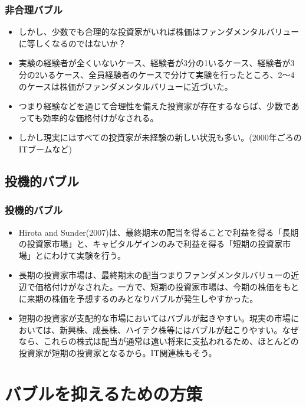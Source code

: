 \documentclass[dvipdfmx,12pt]{beamer}
\begin{document}
\begin{frame}
\frametitle{非合理バブル}
\begin{itemize}\setlength{\parskip}{0.5em}
\item
しかし、少数でも合理的な投資家がいれば株価はファンダメンタルバリューに等しくなるのではないか？
\item
実験の経験者が全くいないケース、経験者が3分の1いるケース、経験者が3分の2いるケース、全員経験者のケースで分けて実験を行ったところ、2〜4のケースは株価がファンダメンタルバリューに近づいた。
\item
つまり経験などを通じて合理性を備えた投資家が存在するならば、少数であっても効率的な価格付けがなされる。
\item
しかし現実にはすべての投資家が未経験の新しい状況も多い。(2000年ごろのITブームなど)
\end{itemize}
\end{frame}

\subsection{投機的バブル}
\begin{frame}
\frametitle{投機的バブル}
\begin{itemize}\setlength{\parskip}{0.5em}
\item
Hirota and Sunder(2007)は、最終期末の配当を得ることで利益を得る「長期の投資家市場」と、キャピタルゲインのみで利益を得る「短期の投資家市場」とにわけて実験を行う。
\item
長期の投資家市場は、最終期末の配当つまりファンダメンタルバリューの近辺で価格付けがなされた。一方で、短期の投資家市場は、今期の株価をもとに来期の株価を予想するのみとなりバブルが発生しやすかった。
\item
短期の投資家が支配的な市場においてはバブルが起きやすい。現実の市場においては、新興株、成長株、ハイテク株等にはバブルが起こりやすい。なぜなら、これらの株式は配当が通常は遠い将来に支払われるため、ほとんどの投資家が短期の投資家となるから。IT関連株もそう。
\end{itemize}
\end{frame}

\section{バブルを抑えるための方策}
\end{document}
